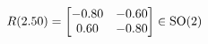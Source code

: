 \documentclass[preview]{standalone}
\begin{document}
\begin{align*}
\special{dvisvgm:raw <g id='unique000'>}R(2.50) = \begin{bmatrix} -0.80 & -0.60 \\ 0.60 & -0.80 \end{bmatrix} \in \text{SO}(2)\special{dvisvgm:raw </g>}
\end{align*}
\end{document}
